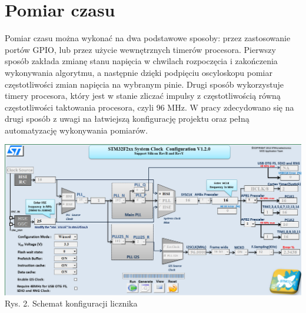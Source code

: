 \documentclass[oneside]{mgr}
\begin{document}
\chapter{Pomiar czasu}
Pomiar czasu można wykonać na dwa podstawowe sposoby: przez zastosowanie portów GPIO, lub przez użycie wewnętrznych timerów procesora. Pierwszy sposób zakłada zmianę stanu napięcia w chwilach rozpoczęcia i zakończenia wykonywania algorytmu, a następnie dzięki podpięciu oscyloskopu pomiar częstotliwości zmian napięcia na wybranym pinie. Drugi sposób wykorzystuje timery procesora, który jest w stanie zliczać impulsy z częstotliwością równą częstotliwości taktowania procesora, czyli 96 MHz. W pracy zdecydowano się na drugi sposób z uwagi na łatwiejszą konfigurację projektu oraz pełną automatyzację wykonywania pomiarów.\\
\begin{center}
\includegraphics[width = \textwidth]{liczniki}
\\Rys. 2. Schemat konfiguracji licznika
\end{center}
\end{document}
